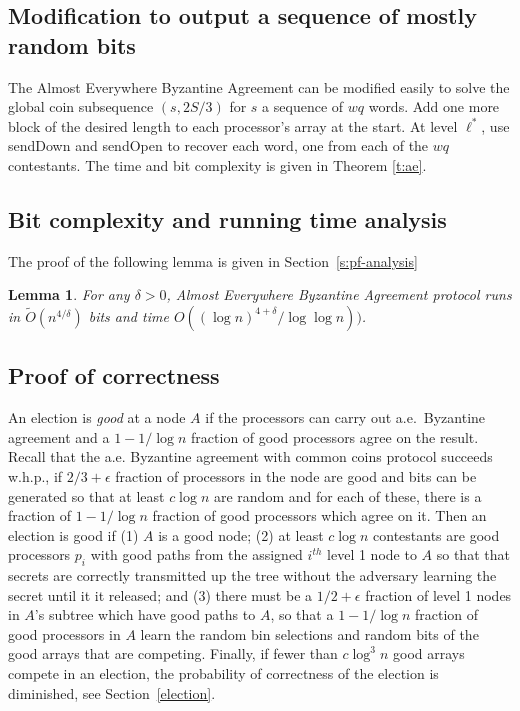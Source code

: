 \documentclass[letterpaper,11pt]{article}
\newtheorem{lemma}{Lemma}
\begin{document}
\subsection{Modification to output a sequence of mostly random bits}\label{GCS}

The Almost Everywhere Byzantine Agreement can be modified easily to solve the global coin subsequence $(s,2S/3)$ for $s$ a sequence of $wq$ words.  Add one more block of the desired length to each processor's array at the start. At level $\ell^*$, use sendDown and sendOpen to recover each word, one from each of the $wq$ contestants. The time and bit complexity is given in Theorem \ref{t:ae}. 

\subsection{Bit complexity and running time analysis}\label{analysis}

The proof of the following lemma is given in Section~\ref{s:pf-analysis}

\begin{lemma}\label{l:analysis}
For any $\delta >0$, Almost Everywhere Byzantine Agreement protocol runs in $\tilde{O}(n^{4/\delta}) $ bits  and time $O((\log n)^{4 + \delta} / \log \log n) )$.
\end{lemma}


\subsection{Proof of correctness}\label{correct}

An election is {\it good}  at a node $A$  if the processors can carry out  a.e.\ Byzantine agreement and a $1-1/\log n$ fraction of good processors agree on the result. Recall that the a.e. Byzantine agreement with common coins protocol succeeds w.h.p., if $2/3+\epsilon $ fraction of processors in the node are good
and bits can be generated so that at least $c\log n$ are random and for each of these, there is a fraction of $1-1/\log n$ fraction of good processors which agree on it. 
Then an election is good if  (1) $A$ is a good node; (2) at least $c\log n$ contestants are good processors $p_i$ with good paths from 
the assigned $i^{th}$ level 1 node to  $A$ so that that secrets are correctly transmitted up the tree without the adversary learning the secret until it it released; and (3) there must be a $1/2 + \epsilon$ fraction of level 1 nodes in $A$'s subtree which have good paths to $A$, so that a $1-1/\log n$ fraction of good processors in $A$ learn the random bin selections and random bits of the good arrays that are competing.  Finally, if fewer than $c \log^3 n$ good arrays compete in an election, the probability of correctness of the election is diminished, see Section~\ref{election}. 
  
\end{document}
